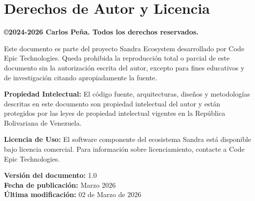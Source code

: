 \thispagestyle{empty}
\vspace*{3cm}

\section*{Derechos de Autor y Licencia}

\textbf{\copyright 2024-2026 Carlos Pe\~{n}a. Todos los derechos reservados.}

Este documento es parte del proyecto Sandra Ecosystem desarrollado por Code Epic Technologies. Queda prohibida la reproducci\'on total o parcial de este documento sin la autorizaci\'on escrita del autor, excepto para fines educativos y de investigaci\'on citando apropiadamente la fuente.

\textbf{Propiedad Intelectual:} El c\'odigo fuente, arquitecturas, dise\~nos y metodolog\'ias descritas en este documento son propiedad intelectual del autor y est\'an protegidos por las leyes de propiedad intelectual vigentes en la Rep\'ublica Bolivariana de Venezuela.

\textbf{Licencia de Uso:} El software componente del ecosistema Sandra est\'a disponible bajo licencia comercial. Para informaci\'on sobre licenciamiento, contacte a Code Epic Technologies.

\vspace{1cm}

\textbf{Versi\'on del documento:} 1.0\\
\textbf{Fecha de publicaci\'on:} Marzo 2026\\
\textbf{Última modificaci\'on:} 02 de Marzo de 2026

\newpage
